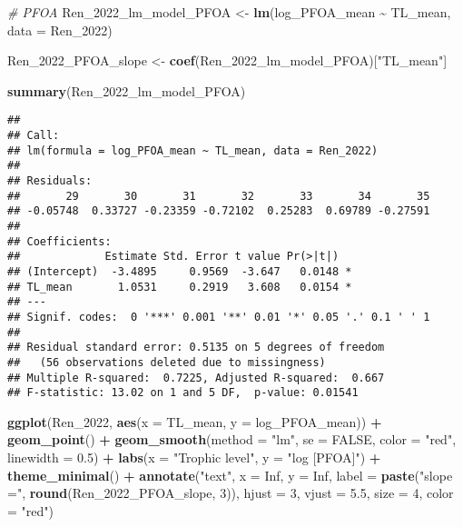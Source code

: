 \documentclass[
]{article}
\newenvironment{Shaded}{\begin{snugshade}}{\end{snugshade}}
\newcommand{\AttributeTok}[1]{\textcolor[rgb]{0.13,0.29,0.53}{#1}}
\newcommand{\CommentTok}[1]{\textcolor[rgb]{0.56,0.35,0.01}{\textit{#1}}}
\newcommand{\ConstantTok}[1]{\textcolor[rgb]{0.56,0.35,0.01}{#1}}
\newcommand{\DecValTok}[1]{\textcolor[rgb]{0.00,0.00,0.81}{#1}}
\newcommand{\FloatTok}[1]{\textcolor[rgb]{0.00,0.00,0.81}{#1}}
\newcommand{\FunctionTok}[1]{\textcolor[rgb]{0.13,0.29,0.53}{\textbf{#1}}}
\newcommand{\NormalTok}[1]{#1}
\newcommand{\OtherTok}[1]{\textcolor[rgb]{0.56,0.35,0.01}{#1}}
\newcommand{\SpecialCharTok}[1]{\textcolor[rgb]{0.81,0.36,0.00}{\textbf{#1}}}
\newcommand{\StringTok}[1]{\textcolor[rgb]{0.31,0.60,0.02}{#1}}
\begin{document}
\begin{Shaded}
\begin{Highlighting}[]
\CommentTok{\# PFOA}
\NormalTok{Ren\_2022\_lm\_model\_PFOA }\OtherTok{\textless{}{-}} \FunctionTok{lm}\NormalTok{(log\_PFOA\_mean }\SpecialCharTok{\textasciitilde{}}\NormalTok{ TL\_mean,}
                              \AttributeTok{data =}\NormalTok{ Ren\_2022)}

\NormalTok{Ren\_2022\_PFOA\_slope }\OtherTok{\textless{}{-}} \FunctionTok{coef}\NormalTok{(Ren\_2022\_lm\_model\_PFOA)[}\StringTok{"TL\_mean"}\NormalTok{]}

\FunctionTok{summary}\NormalTok{(Ren\_2022\_lm\_model\_PFOA)}
\end{Highlighting}
\end{Shaded}

\begin{verbatim}
## 
## Call:
## lm(formula = log_PFOA_mean ~ TL_mean, data = Ren_2022)
## 
## Residuals:
##       29       30       31       32       33       34       35 
## -0.05748  0.33727 -0.23359 -0.72102  0.25283  0.69789 -0.27591 
## 
## Coefficients:
##             Estimate Std. Error t value Pr(>|t|)  
## (Intercept)  -3.4895     0.9569  -3.647   0.0148 *
## TL_mean       1.0531     0.2919   3.608   0.0154 *
## ---
## Signif. codes:  0 '***' 0.001 '**' 0.01 '*' 0.05 '.' 0.1 ' ' 1
## 
## Residual standard error: 0.5135 on 5 degrees of freedom
##   (56 observations deleted due to missingness)
## Multiple R-squared:  0.7225, Adjusted R-squared:  0.667 
## F-statistic: 13.02 on 1 and 5 DF,  p-value: 0.01541
\end{verbatim}

\begin{Shaded}
\begin{Highlighting}[]
\FunctionTok{ggplot}\NormalTok{(Ren\_2022, }\FunctionTok{aes}\NormalTok{(}\AttributeTok{x =}\NormalTok{ TL\_mean, }\AttributeTok{y =}\NormalTok{ log\_PFOA\_mean)) }\SpecialCharTok{+}
  \FunctionTok{geom\_point}\NormalTok{() }\SpecialCharTok{+}
  \FunctionTok{geom\_smooth}\NormalTok{(}\AttributeTok{method =} \StringTok{"lm"}\NormalTok{, }\AttributeTok{se =} \ConstantTok{FALSE}\NormalTok{, }\AttributeTok{color =} \StringTok{"red"}\NormalTok{, }\AttributeTok{linewidth =} \FloatTok{0.5}\NormalTok{) }\SpecialCharTok{+}
  \FunctionTok{labs}\NormalTok{(}\AttributeTok{x =} \StringTok{"Trophic level"}\NormalTok{,}
       \AttributeTok{y =} \StringTok{"log [PFOA]"}\NormalTok{) }\SpecialCharTok{+}
  \FunctionTok{theme\_minimal}\NormalTok{() }\SpecialCharTok{+}
  \FunctionTok{annotate}\NormalTok{(}\StringTok{"text"}\NormalTok{, }\AttributeTok{x =} \ConstantTok{Inf}\NormalTok{, }\AttributeTok{y =} \ConstantTok{Inf}\NormalTok{, }\AttributeTok{label =} \FunctionTok{paste}\NormalTok{(}\StringTok{"slope ="}\NormalTok{, }\FunctionTok{round}\NormalTok{(Ren\_2022\_PFOA\_slope, }\DecValTok{3}\NormalTok{)), }
           \AttributeTok{hjust =} \DecValTok{3}\NormalTok{, }\AttributeTok{vjust =} \FloatTok{5.5}\NormalTok{, }\AttributeTok{size =} \DecValTok{4}\NormalTok{, }\AttributeTok{color =} \StringTok{"red"}\NormalTok{)}
\end{Highlighting}
\end{Shaded}
\end{document}

